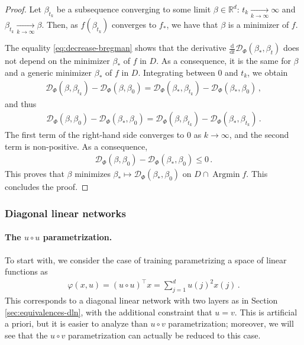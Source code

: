 \documentclass[11pt,reqno]{article}
\DeclareMathOperator*{\Argmin}{Argmin}
\newcommand{\diff}{\mathrm{d}}
\newcommand{\R}{\mathbb{R}}
\newcommand{\cD}{\mathcal{D}}
\renewcommand{\leq}{\leqslant}
\numberwithin{equation}{section}
\theoremstyle{plain}
\theoremstyle{definition}
\theoremstyle{remark}
\begin{document}
\begin{proof}
Let $\beta_{t_k}$ be a subsequence converging to some limit $\beta \in \R^d$: $t_k \xrightarrow[k \to \infty]{} \infty$ and $\beta_{t_k} \xrightarrow[k \to \infty]{} \beta$. Then, as $f(\beta_{t_k})$ converges to $f_*$, we have that $\beta$ is a minimizer of $f$. 

The equality \eqref{eq:decrease-bregman} shows that the derivative $\frac{\diff }{\diff t} \cD_\Phi(\beta_*, \beta_t)$ does not depend on the minimizer $\beta_*$ of $f$ in $D$. As a consequence, it is the same for $\beta$ and a generic minimizer $\beta_*$ of $f$ in $D$. Integrating between $0$ and $t_k$, we obtain 
	\begin{align*}
		\cD_\Phi(\beta,\beta_{t_k}) - \cD_\Phi(\beta,\beta_0) = \cD_\Phi(\beta_*,\beta_{t_k}) - \cD_\Phi(\beta_*,\beta_0) \, ,
	\end{align*}
	and thus 
	\begin{align*}
		 \cD_\Phi(\beta,\beta_0)- \cD_\Phi(\beta_*,\beta_0) = \cD_\Phi(\beta,\beta_{t_k}) -  \cD_\Phi(\beta_*,\beta_{t_k}) \, .
	\end{align*}
	The first term of the right-hand side converges to $0$ as $k \to \infty$, and the second term is non-positive. As a consequence, 
	\begin{align*}
		\cD_\Phi(\beta,\beta_0)- \cD_\Phi(\beta_*,\beta_0) \leq 0 \, . 
	\end{align*}
	This proves that $\beta$ minimizes $\beta_* \mapsto \cD_\Phi(\beta_*,\beta_0)$ on $D \cap \Argmin f$. This concludes the proof.
\end{proof}


\subsubsection{Diagonal linear networks}

\paragraph{The $u \circ u$ parametrization.} To start with, we consider the case of training parametrizing a space of linear functions as 
\begin{align*}
	\varphi(x,u) = (u \circ u)^\top x = \sum_{j=1}^{d} u(j)^2 x(j) \, .
\end{align*}
This corresponds to a diagonal linear network with two layers as in Section \ref{sec:equivalences-dln}, with the additional constraint that $u = v$. This is artificial a priori, but it is easier to analyze than $u \circ v$ parametrization; moreover, we will see that the $u \circ v$ parametrization can actually be reduced to this case. 
\end{document}
